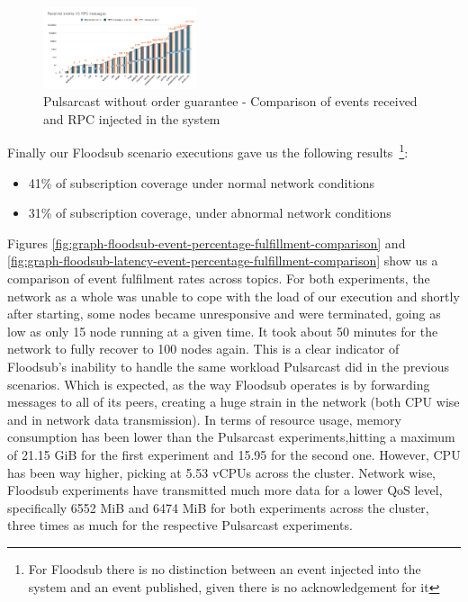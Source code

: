 \begin{figure}[!htb]
  \centering
  \includegraphics[width=0.4\textwidth]{img/graph-pulsarcast-rpc.png}
  \caption{Pulsarcast without order guarantee - Comparison of events received and RPC injected in the system}
  \label{fig:graph-pulsarcast-rpc}
\end{figure}

Finally our Floodsub scenario executions gave us the following
results~\footnote{For Floodsub there is no distinction between an event
injected into the system and an event published, given there is no
acknowledgement for it}:

\begin{itemize}
  \item 41\% of subscription coverage under normal network conditions
  \item 31\% of subscription coverage, under abnormal network conditions
\end{itemize}

Figures \ref{fig:graph-floodsub-event-percentage-fulfillment-comparison} and
\ref{fig:graph-floodsub-latency-event-percentage-fulfillment-comparison} show
us a comparison of event fulfilment rates across topics. For both experiments,
the network as a whole was unable to cope with the load of our execution and
shortly after starting, some nodes became unresponsive and were terminated,
going as low as only 15 node running at a given time. It took about 50 minutes
for the network to fully recover to 100 nodes again. This is a clear indicator
of Floodsub's inability to handle the same workload Pulsarcast did in the
previous scenarios. Which is expected, as the way Floodsub operates is by
forwarding messages to all of its peers, creating a huge strain in the network
(both CPU wise and in network data transmission). In terms of resource usage,
memory consumption has been lower than the Pulsarcast experiments,hitting a
maximum of 21.15 GiB for the first experiment and 15.95 for the second one.
However, CPU has been way higher, picking at 5.53 vCPUs across the cluster.
Network wise, Floodsub experiments have transmitted much more data for a lower
QoS level, specifically 6552 MiB and 6474 MiB for both experiments across the
cluster, three times as much for the respective Pulsarcast experiments.

